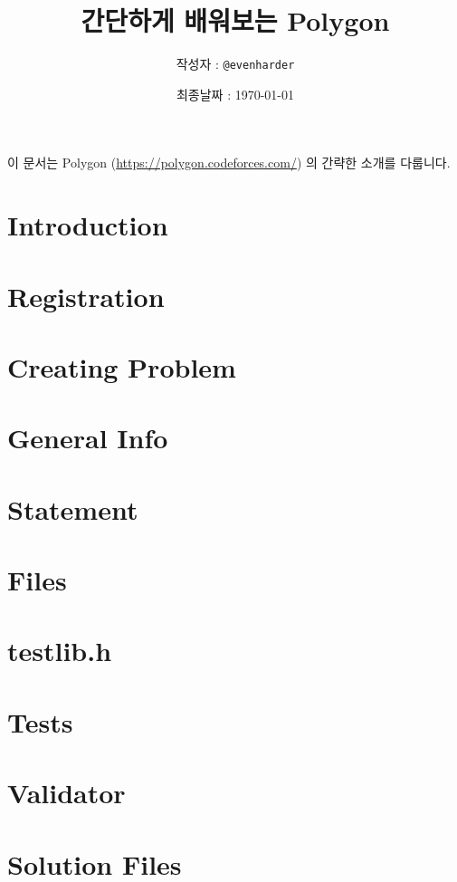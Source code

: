 \documentclass{article}
\title{간단하게 배워보는 Polygon}
\author{작성자 : \texttt{@evenharder}}
\date{최종날짜 : \today}
\begin{document}
    \maketitle
    이 문서는 Polygon (\url{https://polygon.codeforces.com/}) 의 간략한 소개를 다룹니다.
    \tableofcontents
    \newpage
    \section{Introduction}
    
    \section{Registration}
    
    \section{Creating Problem}
    
    \section{General Info}
    
    \section{Statement}
    
    \section{Files}
    
    \section{testlib.h}
    
    \section{Tests}
    
    \section{Validator}
    
    \section{Solution Files}
    
\end{document}
